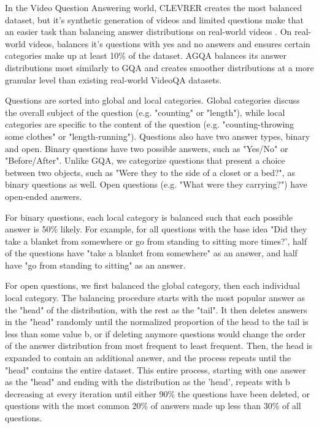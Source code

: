 In the Video Question Answering world, CLEVRER creates the most balanced dataset, but it's synthetic generation of videos and limited questions make that an easier task than balancing answer distributions on real-world videos \cite{yi2019clevrer}. On real-world videos, \cite{yu2019activitynet} balances it's questions with yes and no answers and ensures certain categories make up at least 10\% of the dataset. AGQA balances its answer distributions most similarly to GQA and creates smoother distributions at a more granular level than existing real-world VideoQA datasets. 

Questions are sorted into global and local categories. Global categories discuss the overall subject of the question (e.g. "counting" or "length"), while local categories are specific to the content of the question (e.g. "counting-throwing some clothes" or "length-running"). Questions also have two answer types, binary and open. Binary questions have two possible answers, such as "Yes/No" or "Before/After". Unlike GQA, we categorize questions that present a choice between two objects, such as "Were they to the side of a closet or a bed?", as binary questions as well. Open questions (e.g. "What were they carrying?") have open-ended answers. 

For binary questions, each local category is balanced such that each possible answer is 50\% likely. For example, for all questions with the base idea "Did they take a blanket from somewhere or go from standing to sitting more times?', half of the questions have "take a blanket from somewhere" as an answer, and half have "go from standing to sitting" as an answer. 

For open questions, we first balanced the global category, then each individual local category. 
The balancing procedure starts with the most popular answer as the "head" of the distribution, with the rest as the "tail". It then deletes answers in the "head" randomly until the normalized proportion of the head to the tail is less than some value b, or if deleting anymore questions would change the order of the answer distribution from most frequent to least frequent. Then, the head is expanded to contain an additional answer, and the process repeats until the "head" contains the entire dataset. This entire process, starting with one answer as the "head" and ending with the distribution as the 'head', repeats with b decreasing at every iteration until either 90\% the questions have been deleted, or questions with the most common 20\% of answers made up less than 30\% of all questions. 

